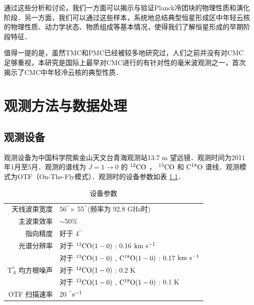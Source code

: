 \documentclass[UTF8, nocolorlinks]{pkuthss}
\newcommand{\coa}{$\rm ^{12}CO$ }
\newcommand{\cob}{$\rm ^{13}CO$ }
\newcommand{\coc}{$\rm C^{18}O$ }
\newcommand{\coaa}{$\rm^{12}CO(1-0)$ }
\newcommand{\cobb}{$\rm^{13}CO(1-0)$ }
\newcommand{\cocc}{$\rm C^{18}O(1-0)$ }
\newcommand{\kms}{$\rm km\ s^{-1}$}
\newcommand{\arcsec}{$^{\prime\prime}$}
\begin{document}
		通过这些分析和讨论，我们一方面可以揭示与验证Planck冷团块的物理性质和演化阶段．另一方面，我们可以通过这些样本，系统地总结典型恒星形成区中年轻云核的物理性质、动力学状态、物质组成等基本情况，使得我们了解恒星形成的早期阶段特征．

		值得一提的是，虽然TMC和PMC已经被较多地研究过，人们之前并没有对CMC足够重视，本研究是国际上最早对CMC进行的有针对性的毫米波观测之一，首次揭示了CMC中年轻冷云核的典型性质．

\chapter{观测方法与数据处理}

	\section{观测设备}
		观测设备为中国科学院紫金山天文台青海观测站13.7 m 望远镜．观测时间为2011年1月至5月．观测的谱线为 $J=1 \rightarrow 0 $ 的  \coa， \cob 和 \coc 谱线．观测模式为OTF（On-The-Fly模式）．观测时的设备参数如表 \ref{Tab.Observation}．

		\begin{table}[H]
	        \begin{center}
	        \caption{设备参数\label{Tab.Observation}}
	        \setlength{\tabcolsep}{0.1in}
	        \vspace{0.5em}
	        \begin{tabular}{rl}
	        \toprule
	        \hline
	        天线波束宽度              & 56\arcsec$\times$ 55\arcsec (频率为 92.8 GHz时) \\
	        主波束效率                & $\sim$50\%                               \\
	        指向精度                & 好于 4\arcsec                     \\
	        光谱分辨率               & 对于 \coaa: 0.16 \kms                     \\
	                                & 对于 \cobb, \cocc:  0.17 \kms           \\
	        T$^*_A$ 均方根噪声       & 对于 \coaa: 0.2 K                         \\
	                                & 对于 \cobb, \cocc: 0.1 K               \\
	        OTF 扫描速率            & 20 \arcsec $\rm s^{-1}$\\
	        \hline
	        \bottomrule
	        \end{tabular}
	        \end{center}
        \end{table}
\end{document}
